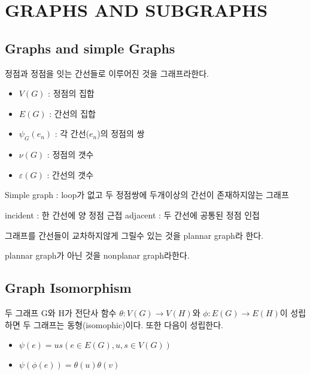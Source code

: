 \documentclass{oblivoir}
\begin{document}
\tableofcontents

\section{GRAPHS AND SUBGRAPHS}
\subsection{Graphs and simple Graphs}
\begin{dfn}[Graph] 정점과 정점을 잇는 간선들로 이루어진 것을 그래프라한다.
    \begin{itemize}
        \item $V(G)$ :  정점의 집합
        \item $E(G)$ :  간선의 집합
        \item $\psi_G(e_n)$ :  각 간선($e_n$)의 정점의 쌍
        \item $\nu(G)$ :  정점의 갯수 
        \item $\varepsilon(G)$ :  간선의 갯수
    \end{itemize}

    Simple graph : loop가 없고 두 정점쌍에 두개이상의 간선이 존재하지않는 그래프

    incident : 한 간선에 양 정점 근접
    adjacent : 두 간선에 공통된 정점 인접
\end{dfn}

\begin{dfn}[planar]

    그래프를 간선들이 교차하지않게 그릴수 있는 것을 plannar graph라 한다. 
    
    plannar graph가 아닌 것을 nonplanar graph라한다.
\end{dfn}

\subsection{Graph Isomorphism}

\begin{dfn}[isomophic] 두 그래프 G와 H가  전단사 함수 $\theta : V(G) \longrightarrow V(H)$와 $\phi : E(G) \rightarrow E(H)$이 성립하면 두 그래프는 동형(isomophic)이다.
    또한 다음이 성립한다.
\begin{itemize}
    \item $\psi(e) = us( e \in E(G), u,s \in V(G)) $
    \item $\psi(\phi(e)) = \theta(u)\theta(v)$%
\end{itemize}
\end{dfn}
\end{document}
